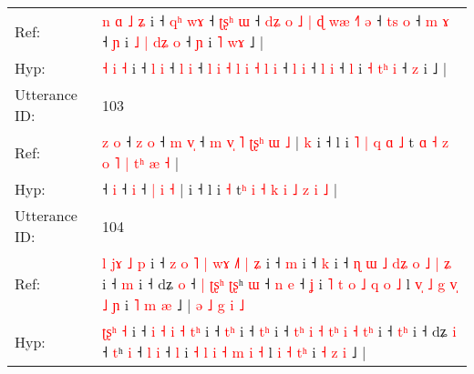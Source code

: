 \documentclass[10pt]{article}
\DeclareRobustCommand{\hl}[1]{{\textcolor{red}{#1}}}
\begin{document}
\begin{longtable}{ll}
Ref: & \hl{n}\hl{ }\hl{ɑ} \hl{˩} \hl{ʑ} i ˧ \hl{q}\hl{ʰ} \hl{w}\hl{ɤ} ˧ \hl{ʈ}\hl{ʂ}\hl{ʰ} \hl{ɯ} ˧ \hl{d}\hl{ʑ} \hl{o} \hl{˩} \hl{|} \hl{ɖ} \hl{w}\hl{æ} \hl{˧}\hl{˥} \hl{ə} ˧ \hl{t}\hl{s} \hl{o} ˧ \hl{m} \hl{ɤ} ˧ \hl{ɲ} i\hl{ }\hl{˩} \hl{|} \hl{d}\hl{ʑ} \hl{o} ˧ \hl{ɲ} i\hl{ }\hl{˥}\hl{ }\hl{w}\hl{ɤ} ˩ |
 \\
Hyp: & \hl{}\hl{}\hl{˧} \hl{i} \hl{˧} i ˧ \hl{}\hl{l} \hl{}\hl{i} ˧ \hl{}\hl{}\hl{l} \hl{i} ˧ \hl{}\hl{l} \hl{i} \hl{˧} \hl{l} \hl{i} \hl{}\hl{˧} \hl{}\hl{l} \hl{i} ˧ \hl{}\hl{l} \hl{i} ˧ \hl{l} \hl{i} ˧ \hl{l} i\hl{}\hl{} \hl{˧} \hl{t}\hl{ʰ} \hl{i} ˧ \hl{z} i\hl{}\hl{}\hl{}\hl{}\hl{} ˩ |
 \\
\midrule
Utterance ID: & 103 \\
Ref: & \hl{z}\hl{ }\hl{o}\hl{ }˧\hl{ }\hl{z} \hl{o} ˧\hl{ }\hl{m} \hl{v}\hl{̩} ˧\hl{ }\hl{m}\hl{ }\hl{v}\hl{̩}\hl{ }\hl{˥} \hl{ʈ}\hl{ʂ}\hl{ʰ} \hl{ɯ} \hl{˩} |\hl{ }\hl{k} i ˧ l i\hl{ }\hl{˥}\hl{ }\hl{|}\hl{ }\hl{q}\hl{ }\hl{ɑ} \hl{˩} t\hl{ }\hl{ɑ} \hl{˧} \hl{z} \hl{o} \hl{˥} \hl{|} \hl{t}\hl{ʰ} \hl{æ} \hl{˧} |
 \\
Hyp: & \hl{}\hl{}\hl{}\hl{}˧\hl{}\hl{} \hl{i} ˧\hl{}\hl{} \hl{}\hl{i} ˧\hl{}\hl{}\hl{}\hl{}\hl{}\hl{}\hl{} \hl{}\hl{}\hl{|} \hl{i} \hl{˧} |\hl{}\hl{} i ˧ l i\hl{}\hl{}\hl{}\hl{}\hl{}\hl{}\hl{}\hl{} \hl{˧} t\hl{}\hl{ʰ} \hl{i} \hl{˧} \hl{k} \hl{i} \hl{˩} \hl{}\hl{z} \hl{i} \hl{˩} |
 \\
\midrule
Utterance ID: & 104 \\
Ref: & \hl{l}\hl{ }\hl{j}\hl{ɤ}\hl{ }\hl{˩} \hl{p} i ˧\hl{ }\hl{z}\hl{ }\hl{o} \hl{˥} \hl{|} \hl{w}\hl{ɤ} \hl{˩}\hl{˥} \hl{|}\hl{ }\hl{ʑ} i ˧ \hl{}\hl{m} i ˧ \hl{}\hl{k} i ˧ \hl{}\hl{ɳ} \hl{ɯ} \hl{˩} \hl{d}\hl{ʑ} \hl{o} \hl{˩} \hl{|}\hl{ }\hl{ʑ} i ˧ \hl{}\hl{m} i ˧ dʑ \hl{o} ˧\hl{ }\hl{|}\hl{ }\hl{ʈ}\hl{ʂ}\hl{ʰ} \hl{ʈ}\hl{ʂ}ʰ \hl{ɯ} ˧ \hl{n} \hl{e} ˧ \hl{ʝ} i \hl{˥} \hl{t} \hl{o} \hl{˩} \hl{q} \hl{o} \hl{˩} l\hl{ }\hl{v}\hl{̩}\hl{ }\hl{˩} \hl{g} \hl{v}\hl{̩} \hl{˩}\hl{ }\hl{ɲ} i \hl{˥} \hl{m} \hl{æ} ˩ |\hl{ }\hl{ə}\hl{ }\hl{˩}\hl{ }\hl{g}\hl{ }\hl{i}\hl{ }\hl{˩}
 \\
Hyp: & \hl{}\hl{}\hl{}\hl{ʈ}\hl{ʂ}\hl{ʰ} \hl{˧} i ˧\hl{}\hl{}\hl{}\hl{} \hl{i} \hl{˧} \hl{}\hl{i} \hl{}\hl{˧} \hl{}\hl{t}\hl{ʰ} i ˧ \hl{t}\hl{ʰ} i ˧ \hl{t}\hl{ʰ} i ˧ \hl{t}\hl{ʰ} \hl{i} \hl{˧} \hl{t}\hl{ʰ} \hl{i} \hl{˧} \hl{}\hl{t}\hl{ʰ} i ˧ \hl{t}\hl{ʰ} i ˧ dʑ \hl{i} ˧\hl{}\hl{}\hl{}\hl{}\hl{}\hl{} \hl{}\hl{t}ʰ \hl{i} ˧ \hl{l} \hl{i} ˧ \hl{l} i \hl{˧} \hl{l} \hl{i} \hl{˧} \hl{m} \hl{i} \hl{˧} l\hl{}\hl{}\hl{}\hl{}\hl{} \hl{i} \hl{}\hl{˧} \hl{}\hl{t}\hl{ʰ} i \hl{˧} \hl{z} \hl{i} ˩ |\hl{}\hl{}\hl{}\hl{}\hl{}\hl{}\hl{}\hl{}\hl{}\hl{}

\end{longtable}
\end{document}
